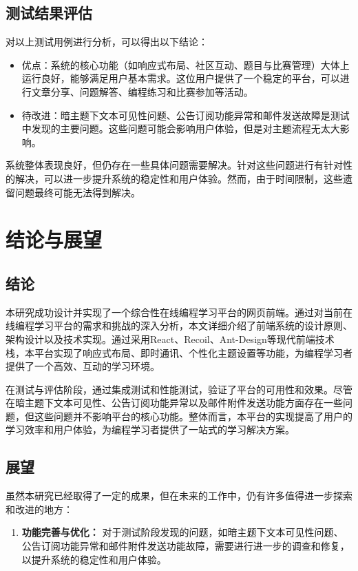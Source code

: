 \documentclass[12pt,a4paper]{article}
\begin{document}
\begin{CJK*}{UTF8}{gbsn}
\subsection{测试结果评估}
对以上测试用例进行分析，可以得出以下结论：
\begin{itemize}
    \item 优点：系统的核心功能（如响应式布局、社区互动、题目与比赛管理）大体上运行良好，能够满足用户基本需求。这位用户提供了一个稳定的平台，可以进行文章分享、问题解答、编程练习和比赛参加等活动。
    \item 待改进：暗主题下文本可见性问题、公告订阅功能异常和邮件发送故障是测试中发现的主要问题。这些问题可能会影响用户体验，但是对主题流程无太大影响。
\end{itemize}

系统整体表现良好，但仍存在一些具体问题需要解决。针对这些问题进行有针对性的解决，可以进一步提升系统的稳定性和用户体验。然而，由于时间限制，这些遗留问题最终可能无法得到解决。


\section{结论与展望}

\subsection{结论}

本研究成功设计并实现了一个综合性在线编程学习平台的网页前端。通过对当前在线编程学习平台的需求和挑战的深入分析，本文详细介绍了前端系统的设计原则、架构设计以及技术实现。通过采用React、Recoil、Ant-Design等现代前端技术栈，本平台实现了响应式布局、即时通讯、个性化主题设置等功能，为编程学习者提供了一个高效、互动的学习环境。

在测试与评估阶段，通过集成测试和性能测试，验证了平台的可用性和效果。尽管在暗主题下文本可见性、公告订阅功能异常以及邮件附件发送功能方面存在一些问题，但这些问题并不影响平台的核心功能。整体而言，本平台的实现提高了用户的学习效率和用户体验，为编程学习者提供了一站式的学习解决方案。

\subsection{展望}

虽然本研究已经取得了一定的成果，但在未来的工作中，仍有许多值得进一步探索和改进的地方：

\begin{enumerate}
    \item \textbf{功能完善与优化：} 对于测试阶段发现的问题，如暗主题下文本可见性问题、公告订阅功能异常和邮件附件发送功能故障，需要进行进一步的调查和修复，以提升系统的稳定性和用户体验。
    

\end{enumerate}
\end{CJK*}
\end{document}
